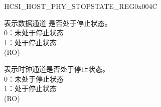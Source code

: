 \begin{register}{H}{CSI\_HOST\_PHY\_STOPSTATE\_REG}{0x004C}\label{regdesc:CSIHOSTPHYSTOPSTATEREG}
%
%
%
%
%
\regnewline%
\begin{regdesc}\begin{reglist}
\label{fielddesc:CSIHOSTPHYSTOPSTATEDATA0}\item [CSI\_HOST\_PHY\_STOPSTATEDATA\_\regindex{n} (\regindex{n}：0-1)] 表示数据通道  是否处于停止状态。\\
0：未处于停止状态\\
1：处于停止状态\\
(RO)
\label{fielddesc:CSIHOSTPHYSTOPSTATECLK}\item [CSI\_HOST\_PHY\_STOPSTATECLK] 表示时钟通道是否处于停止状态。\\ 
0：未处于停止状态\\
1：处于停止状态\\
(RO)
\end{reglist}\end{regdesc}
\end{register}
